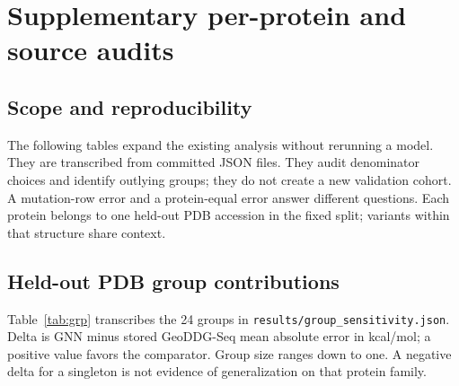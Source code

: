 \clearpage
\section{Supplementary per-protein and source audits}
\subsection{Scope and reproducibility}
The following tables expand the existing analysis without rerunning a model. They are transcribed from committed JSON files. They audit denominator choices and identify outlying groups; they do not create a new validation cohort. A mutation-row error and a protein-equal error answer different questions. Each protein belongs to one held-out PDB accession in the fixed split; variants within that structure share context.
\subsection{Held-out PDB group contributions}
Table~\ref{tab:grp} transcribes the 24 groups in \texttt{results/group\_sensitivity.json}. Delta is GNN minus stored GeoDDG-Seq mean absolute error in kcal/mol; a positive value favors the comparator. Group size ranges down to one. A negative delta for a singleton is not evidence of generalization on that protein family.
